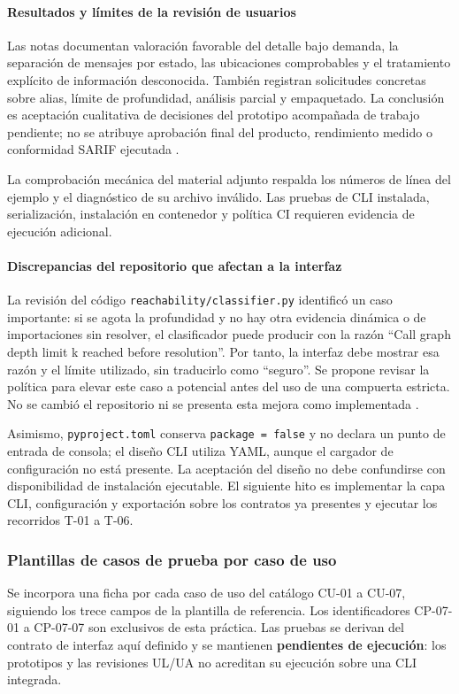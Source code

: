 \paragraph*{Resultados y límites de la revisión de usuarios}
Las notas documentan valoración favorable del detalle bajo demanda, la separación de mensajes por estado, las ubicaciones comprobables y el tratamiento explícito de información desconocida. También registran solicitudes concretas sobre alias, límite de profundidad, análisis parcial y empaquetado. La conclusión es aceptación cualitativa de decisiones del prototipo acompañada de trabajo pendiente; no se atribuye aprobación final del producto, rendimiento medido o conformidad SARIF ejecutada \parencite{pyreachrevisionusuarios}.

La comprobación mecánica del material adjunto respalda los números de línea del ejemplo y el diagnóstico de su archivo inválido. Las pruebas de CLI instalada, serialización, instalación en contenedor y política CI requieren evidencia de ejecución adicional. 
\paragraph*{Discrepancias del repositorio que afectan a la interfaz}
La revisión del código \texttt{reachability/\allowbreak classifier.\allowbreak py} identificó un caso importante: si se agota la profundidad y no hay otra evidencia dinámica o de importaciones sin resolver, el clasificador puede producir  con la razón ``Call graph depth limit k reached before resolution''. Por tanto, la interfaz debe mostrar esa razón y el límite utilizado, sin traducirlo como ``seguro''. Se propone revisar la política para elevar este caso a potencial antes del uso de una compuerta estricta. No se cambió el repositorio ni se presenta esta mejora como implementada \parencite{pyreach2026repo,nielson1999principles}.

Asimismo, \texttt{pyproject.\allowbreak toml} conserva \texttt{package = false} y no declara un punto de entrada de consola; el diseño CLI utiliza YAML, aunque el cargador de configuración no está presente. La aceptación del diseño no debe confundirse con disponibilidad de instalación ejecutable. El siguiente hito es implementar la capa CLI, configuración y exportación sobre los contratos ya presentes y ejecutar los recorridos T-01 a T-06.


\clearpage
\subsubsection{Plantillas de casos de prueba por caso de uso}
Se incorpora una ficha por cada caso de uso del catálogo CU-01 a CU-07, siguiendo los trece campos de la plantilla de referencia. Los identificadores CP-07-01 a CP-07-07 son exclusivos de esta práctica. Las pruebas se derivan del contrato de interfaz aquí definido y se mantienen \textbf{pendientes de ejecución}: los prototipos y las revisiones UL/UA no acreditan su ejecución sobre una CLI integrada.

